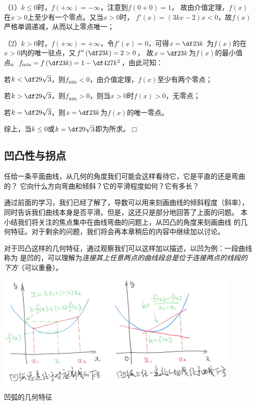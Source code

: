 （1）$k\leq 0$时，$f(+\infty)=-\infty$，注意到$f(0+0)=1$，
故由介值定理，$f(x)$在$x>0$上至少有一个零点。又当$x>0$时，
$f'(x)=(3kx-2)x<0$，故$f(x)$严格单调递减，从而以上零点唯一；

（2）$k>0$时，$f(+\infty)=+\infty$，令$f'(x)=0$，可得$x=\df2{3k}$
为$f(x)$的在$x>0$内的唯一驻点，又$f''\left(\df2{3k}\right)=2>0$，
故$x=\df2{3k}$为$f(x)$的最小值点。$f_{\min}=f\left(\df2{3k}\right)=1
-\df4{27k^2}$，由此可知：

若$k<\df29\sqrt3$，则$f_{\min}<0$，由介值定理，$f(x)$至少有两个零点；

若$k>\df29\sqrt3$，则$f_{\min}>0$，则当$x>0$时$f(x)>0$，无零点；

若$k=\df29\sqrt3$，则$x=\df2{3k}$为$f(x)$的唯一零点。

综上，当$k\leq 0$或$k=\df29\sqrt3$即为所求。\hfill$\Box$

\subsection{凹凸性与拐点}

任给一条平面曲线，从几何的角度我们可能会这样看待它，它是平直的还是弯曲的？
它向什么方向弯曲和倾斜？它的平滑程度如何？它有多长？

通过前面的学习，我们已经了解了，导数可以用来刻画曲线的倾斜程度（斜率），
同时告诉我们曲线本身是否平滑。但是，这还只是部分地回答了上面的问题。
本小结我们将关注的焦点集中在曲线弯曲的问题上，从凹凸的角度来刻画曲线
的几何特征。对于剩余的问题，我们将会再本章稍后的内容中继续加以讨论。


对于凹凸这样的几何特征，通过观察我们可以这样加以描述，以凹为例：一段曲线称为
是凹的，可以理解为{\it 连接其上任意两点的曲线段总是位于连接两点的线段的下方}（可以重叠）。

\begin{center}
 	\includegraphics[width=0.9\textwidth]{./images/ch3/convexCurve.jpg}

	\kaishu 凹弧的几何特征
\end{center}

